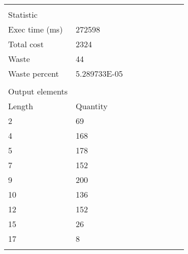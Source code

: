 \begin{longtable}{lllllllll}
                         &              &           &                  &    &    &    &   &    \\
Statistic                &              &           &                  &    &    &    &   &    \\
Exec time (ms)           & 272598       &           &                  &    &    &    &   &    \\
Total cost               & 2324         &           &                  &    &    &    &   &    \\
Waste                    & 44           &           &                  &    &    &    &   &    \\
Waste percent            & 5.289733E-05 &           &                  &    &    &    &   &    \\
                         &              &           &                  &    &    &    &   &    \\
Output elements          &              &           &                  &    &    &    &   &    \\
Length                   & Quantity     &           &                  &    &    &    &   &    \\
2                        & 69           &           &                  &    &    &    &   &    \\
4                        & 168          &           &                  &    &    &    &   &    \\
5                        & 178          &           &                  &    &    &    &   &    \\
7                        & 152          &           &                  &    &    &    &   &    \\
9                        & 200          &           &                  &    &    &    &   &    \\
10                       & 136          &           &                  &    &    &    &   &    \\
12                       & 152          &           &                  &    &    &    &   &    \\
15                       & 26           &           &                  &    &    &    &   &    \\
17                       & 8            &           &                  &    &    &    &   &    \\
                         &              &           &                  &    &    &    &   &    \\

\end{longtable}
